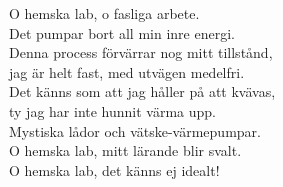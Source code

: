 \documentclass[a6paper, 10pt, twoside]{article}
\begin{document}
\begin{center}
\end{center}
\begin{lyrics}
O hemska lab, o fasliga arbete. \\
Det pumpar bort all min inre energi. \\
Denna process förvärrar nog mitt tillstånd, \\
jag är helt fast, med utvägen medelfri. 
\vspace{5pt} \\
Det känns som att jag håller på att kvävas, \\
ty jag har inte hunnit värma upp. 
\vspace{5pt} \\
Mystiska lådor och vätske-värmepumpar. \\
O hemska lab, mitt lärande blir svalt. \\
O hemska lab, det känns ej idealt! 
\end{lyrics}
\end{document}
